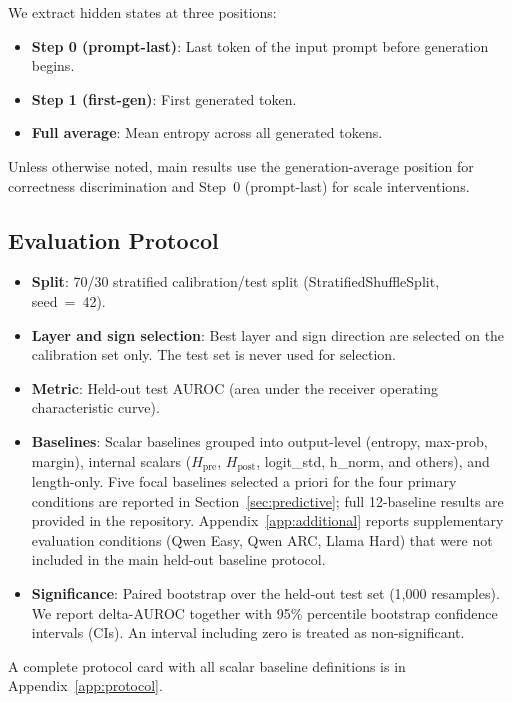 \documentclass{ieeeaccess}
\newcommand{\Hpre}{H_{\text{pre}}}
\newcommand{\Hpost}{H_{\text{post}}}
\begin{document}
We extract hidden states at three positions:

\begin{itemize}
\item \textbf{Step 0 (prompt-last)}: Last token of the input prompt before generation begins.
\item \textbf{Step 1 (first-gen)}: First generated token.
\item \textbf{Full average}: Mean entropy across all generated tokens.
\end{itemize}

\noindent Unless otherwise noted, main results use the generation-average position for correctness discrimination and Step~0 (prompt-last) for scale interventions.

\subsection{Evaluation Protocol}

\begin{itemize}
\item \textbf{Split}: 70/30 stratified calibration/test split (StratifiedShuffleSplit, seed~=~42).
\item \textbf{Layer and sign selection}: Best layer and sign direction are selected on the calibration set only. The test set is never used for selection.
\item \textbf{Metric}: Held-out test AUROC (area under the receiver operating characteristic curve).
\item \textbf{Baselines}: Scalar baselines grouped into output-level (entropy, max-prob, margin), internal scalars ($\Hpre$, $\Hpost$, logit\_std, h\_norm, and others), and length-only. Five focal baselines selected a priori for the four primary conditions are reported in Section~\ref{sec:predictive}; full 12-baseline results are provided in the repository. Appendix~\ref{app:additional} reports supplementary evaluation conditions (Qwen Easy, Qwen ARC, Llama Hard) that were not included in the main held-out baseline protocol.
\item \textbf{Significance}: Paired bootstrap over the held-out test set (1,000 resamples). We report delta-AUROC together with 95\% percentile bootstrap confidence intervals (CIs). An interval including zero is treated as non-significant.
\end{itemize}

\noindent A complete protocol card with all scalar baseline definitions is in Appendix~\ref{app:protocol}.
\end{document}
